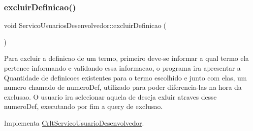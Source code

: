 \mbox{\label{class_servico_usuarios_desenvolvedor_a422f9a3ee77a0d560858c9f7c266b9ee}} 
\subsubsection{\texorpdfstring{excluir\+Definicao()}{excluirDefinicao()}}
{\footnotesize\ttfamily void Servico\+Usuarios\+Desenvolvedor\+::excluir\+Definicao (\begin{DoxyParamCaption}{ }\end{DoxyParamCaption})\hspace{0.3cm}{\ttfamily [virtual]}}

Para excluir a definicao de um termo, primeiro deve-\/se informar a qual termo ela pertence informando e validando essa informacao, o programa ira apresentar a Quantidade de definicoes existentes para o termo escolhido e junto com elas, um numero chamado de numero\+Def, utilizado para poder diferencia-\/las na hora da exclusao. O usuario ira selecionar aquela de deseja exluir atraves desse numero\+Def, executando por fim a query de exclusao.

Implementa \mbox{\hyperlink{class_crlt_servico_usuario_desenvolvedor_a518fe0443e450a73a7274b8dbef74a71}{Crlt\+Servico\+Usuario\+Desenvolvedor}}.


